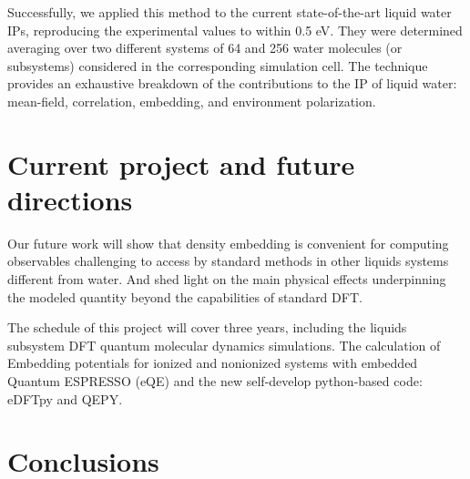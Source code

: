 \documentclass[notitlepage,12pt]{report}
\begin{document}
	Successfully, we applied this method to the current state-of-the-art liquid water IPs, reproducing the experimental values to within 0.5 eV. They were determined averaging over two different systems of 64 and 256 water molecules (or subsystems) considered in the corresponding simulation cell. The technique provides an exhaustive breakdown of the contributions to the IP of liquid water: mean-field, correlation, embedding, and environment polarization.   
\section{Current project and future directions}
	Our future work will show that density embedding is convenient for computing observables challenging to access by standard methods in other liquids systems different from water. And shed light on the main physical effects underpinning the modeled quantity beyond the capabilities of standard DFT.

	The schedule of this project will cover three years, including the liquids subsystem DFT quantum molecular dynamics simulations.  The calculation of Embedding potentials for ionized and nonionized systems with embedded Quantum ESPRESSO (eQE) and the new self-develop python-based code: eDFTpy and QEPY.

\section{Conclusions}


\printbibliography
\end{document}
